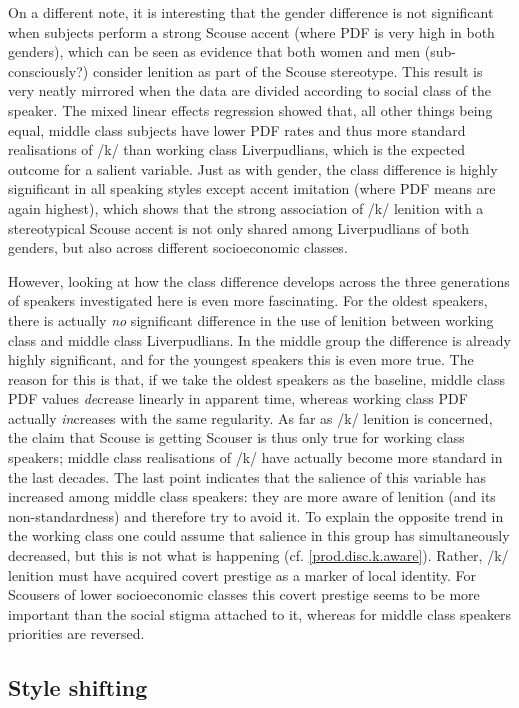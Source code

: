 On a different note, it is interesting that the gender difference is not significant when subjects perform a strong Scouse accent (where PDF is very high in both genders), which can be seen as evidence that both women and men (sub-consciously?) consider lenition as part of the Scouse stereotype.
This result is very neatly mirrored when the data are divided according to social class of the speaker.
The mixed linear effects regression showed that, all other things being equal, middle class subjects have lower PDF rates and thus more standard realisations of /k/ than working class Liverpudlians, which is the expected outcome for a salient variable.
Just as with gender, the class difference is highly significant in all speaking styles except accent imitation (where PDF means are again highest), which shows that the strong association of /k/ lenition with a stereotypical Scouse accent is not only shared among Liverpudlians of both genders, but also across different socioeconomic classes.

However, looking at how the class difference develops across the three generations of speakers investigated here is even more fascinating.
For the oldest speakers, there is actually \emph{no} significant difference in the use of lenition between working class and middle class Liverpudlians.
In the middle group the difference is already highly significant, and for the youngest speakers this is even more true.
The reason for this is that, if we take the oldest speakers as the baseline, middle class PDF values \emph{de}crease linearly in apparent time, whereas working class PDF actually \emph{in}creases with the same regularity.
As far as /k/ lenition is concerned, the claim that Scouse is getting Scouser is thus only true for working class speakers; middle class realisations of /k/ have actually become more standard in the last decades.
The last point indicates that the salience of this variable has increased among middle class speakers: they are more aware of lenition (and its non-standardness) and therefore try to avoid it.
To explain the opposite trend in the working class one could assume that salience in this group has simultaneously decreased, but this is not what is happening (cf. \ref{prod.disc.k.aware}).
Rather, /k/ lenition must have acquired covert prestige as a marker of local identity.
For Scousers of lower socioeconomic classes this covert prestige seems to be more important than the social stigma attached to it, whereas for middle class speakers priorities are reversed.

\subsection{Style shifting}
\label{prod.disc.k.style}

